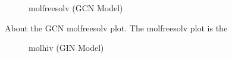 \begin{figure}
    \centering
    \caption{molfreesolv (GCN Model)}
    \label{fig:gcn-molfreesolv}
\end{figure}
About the GCN molfreesolv plot. The molfreesolv plot is the


\begin{figure}
    \centering
    \caption{molhiv (GIN Model)}
\end{figure}



